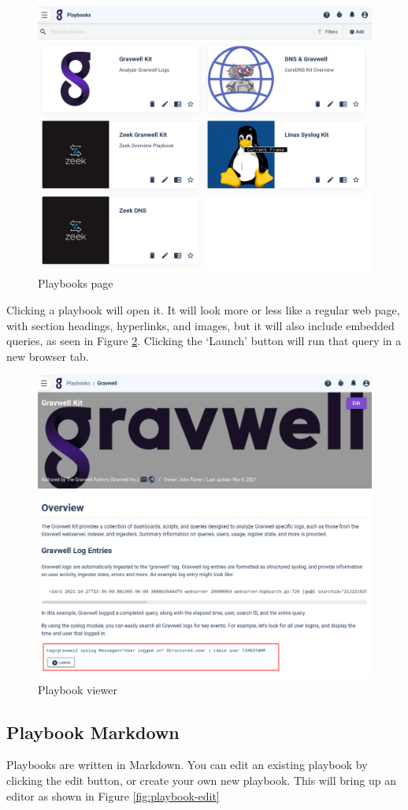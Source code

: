 \begin{figure}
	\includegraphics[width=0.8\linewidth]{images/playbooks.png}
	\caption{Playbooks page}
	\label{fig:playbooks}
\end{figure}

Clicking a playbook will open it. It will look more or less like a regular web page, with section headings, hyperlinks, and images, but it will also include embedded queries, as seen in Figure \ref{fig:playbook-read}. Clicking the `Launch' button will run that query in a new browser tab.

\begin{figure}
	\includegraphics[width=0.8\linewidth]{images/playbook-read.png}
	\caption{Playbook viewer}
	\label{fig:playbook-read}
\end{figure}

\subsection{Playbook Markdown}
Playbooks are written in Markdown. You can edit an existing playbook by clicking the edit button, or create your own new playbook. This will bring up an editor as shown in Figure \ref{fig:playbook-edit}

